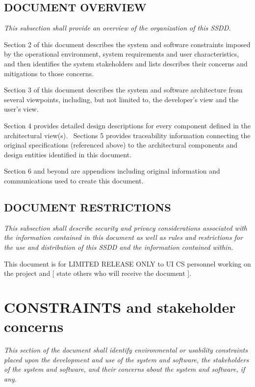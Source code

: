 \documentclass[twoside,letterpaper]{article}
\begin{document}
\subsection{DOCUMENT OVERVIEW}
{\itshape\color{black}
This subsection shall provide an overview of the organization of this
SSDD.}

{\color{black}
Section 2 of this document describes the system and software constraints
imposed by the operational environment, system requirements and user
characteristics, and then identifies the system stakeholders and lists
describes their concerns and mitigations to those concerns.}

{\color{black}
Section 3 of this document describes the system and software
architecture from several viewpoints, including, but not limited to,
the developer{\textquoteright}s view and the user{\textquoteright}s
view.}

{\color{black}
Section 4 provides detailed design descriptions for every component
defined in the architectural view(s). \ Sections 5 provides
traceability information connecting the original specifications
(referenced above) to the architectural components and design entities
identified in this document.}

{\color{black}
Section 6 and beyond are appendices including original information and
communications used to create this document.}

\subsection[DOCUMENT
RESTRICTIONS]{\bfseries\color{black} DOCUMENT
RESTRICTIONS}
{\itshape\color{black}
This subsection shall describe security and privacy considerations
associated with the information contained in this document as well as
rules and restrictions for the use and distribution of this SSDD and
the information contained within.}

{\color{black}
This document is for LIMITED RELEASE ONLY to UI CS personnel working on
the project and [ state others who will receive the document ].}

\section{CONSTRAINTS and stakeholder concerns}
{\itshape\color{black}
This section of the document shall identify environmental or usability
constraints placed upon the development and use of the system and
software, the stakeholders of the system and software, and their
concerns about the system and software, if any.}
\end{document}

